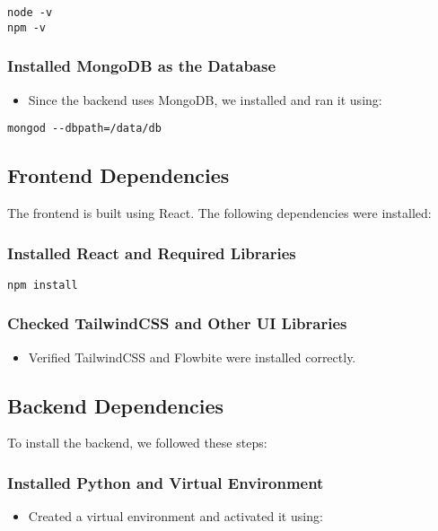 \begin{verbatim}
node -v
npm -v
\end{verbatim}

\subsubsection{Installed MongoDB as the Database}
\begin{itemize}
    \item Since the backend uses MongoDB, we installed and ran it using:
\end{itemize}

\begin{verbatim}
mongod --dbpath=/data/db
\end{verbatim}

\subsection{Frontend Dependencies}

The frontend is built using React. The following dependencies were installed:

\subsubsection{Installed React and Required Libraries}
\begin{verbatim}
npm install
\end{verbatim}

\subsubsection{Checked TailwindCSS and Other UI Libraries}
\begin{itemize}
    \item Verified TailwindCSS and Flowbite were installed correctly.
\end{itemize}

\subsection{Backend Dependencies}

To install the backend, we followed these steps:

\subsubsection{Installed Python and Virtual Environment}
\begin{itemize}
    \item Created a virtual environment and activated it using:
\end{itemize}

